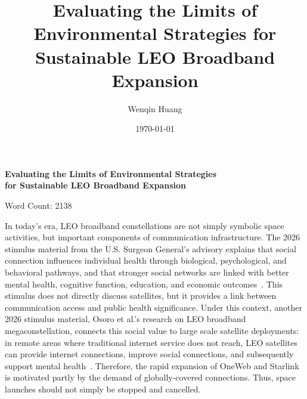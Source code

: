 \documentclass[12pt]{article}
\title{Evaluating the Limits of Environmental Strategies for Sustainable LEO Broadband Expansion}
\author{Wenqin Huang}
\date{\today}
\begin{document}
\RaggedRight
\setlength{\parindent}{0.5in}



\thispagestyle{empty}
\vspace*{2.5in} %
\begin{center}
\textbf{
Evaluating the Limits of Environmental Strategies \\
for Sustainable LEO Broadband Expansion
}

\vspace{0.3cm}

Word Count: 2138
\end{center}

\newpage
In today's era, LEO broadband constellations are not simply symbolic space activities, but important components of communication infrastructure. The 2026 stimulus material from the U.S. Surgeon General's advisory explains that social connection influences individual health through biological, psychological, and behavioral pathways, and that stronger social networks are linked with better mental health, cognitive function, education, and economic outcomes~\citep{us_surgeon_general_2023_social_connection_health}. This stimulus does not directly discuss satellites, but it provides a link between communication access and public health significance. Under this context, another 2026 stimulus material, Osoro et al.'s research on LEO broadband megaconstellation, connects this social value to large scale satellite deployments: in remote areas where traditional internet service does not reach, LEO satellites can provide internet connections, improve social connections, and subsequently support mental health~\citep{osoro2025leo,sandau2010smallsat}. Therefore, the rapid expansion of OneWeb and Starlink is motivated partly by the demand of globally-covered connections. Thus, space launches should not simply be stopped and cancelled.
\end{document}
